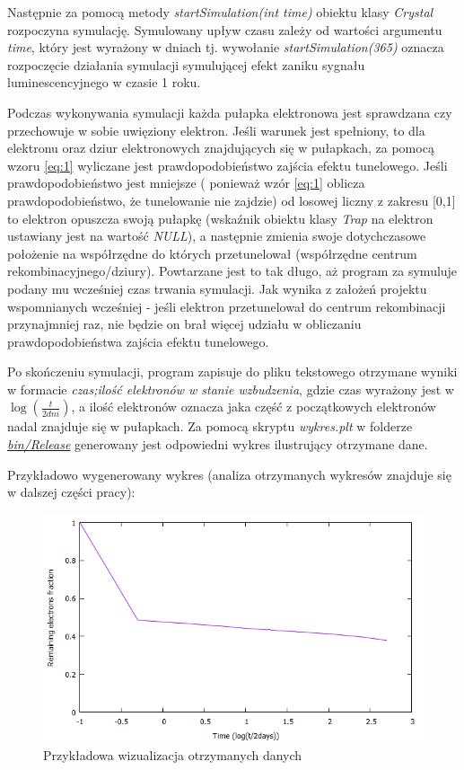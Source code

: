 Następnie za pomocą metody \textit{startSimulation(int time)} obiektu klasy \textit{Crystal} rozpoczyna symulację. Symulowany upływ czasu  zależy od wartości argumentu \textit{time}, który jest wyrażony w dniach tj. wywołanie \emph{startSimulation(365)} oznacza rozpoczęcie działania symulacji symulującej efekt zaniku sygnału luminescencyjnego w czasie 1 roku.

Podczas wykonywania symulacji każda pułapka elektronowa jest sprawdzana czy przechowuje w sobie uwięziony elektron. Jeśli warunek jest spełniony, to dla elektronu oraz dziur elektronowych znajdujących się w pułapkach, za pomocą wzoru \ref{eq:1} wyliczane jest prawdopodobieństwo zajścia efektu tunelowego. Jeśli prawdopodobieństwo jest mniejsze ( ponieważ wzór \ref{eq:1} oblicza prawdopodobieństwo, że tunelowanie nie zajdzie) od losowej liczny z zakresu [0,1] to elektron opuszcza swoją pułapkę (wskaźnik obiektu klasy \textit{Trap} na elektron ustawiany jest na wartość \textit{NULL}), a następnie zmienia swoje dotychczasowe położenie na współrzędne do których przetunelował (współrzędne centrum rekombinacyjnego/dziury). Powtarzane jest to tak długo, aż program za symuluje podany mu wcześniej czas trwania symulacji.  Jak wynika z założeń projektu wspomnianych wcześniej - jeśli elektron przetunelował do centrum rekombinacji przynajmniej raz, nie będzie on brał więcej udziału w obliczaniu prawdopodobieństwa zajścia efektu tunelowego. 

Po skończeniu symulacji, program zapisuje do pliku tekstowego otrzymane wyniki w formacie \textit{czas;ilość elektronów w stanie wzbudzenia}, gdzie czas wyrażony jest w $ \log(\frac{t}{2 dni}) $, a ilość elektronów oznacza jaka część z początkowych elektronów nadal znajduje się w pułapkach. Za pomocą skryptu \textit{wykres.plt}
w folderze \href{https://github.com/Sharkuu/Dissertation/tree/master/bin/Release}{\textit{bin/Release}} generowany jest odpowiedni wykres ilustrujący otrzymane dane. 

Przykładowo wygenerowany wykres (analiza otrzymanych wykresów znajduje się w dalszej części pracy):

\begin{figure}[H]
\centering
\includegraphics[width=15cm]{wykres1}
\caption{Przykładowa wizualizacja otrzymanych danych}
\label{fig:example}
\end{figure}

